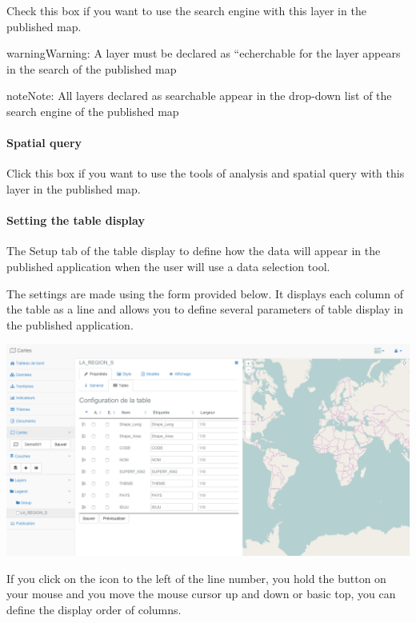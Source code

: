 \documentclass[letterpaper,10pt,english]{sphinxmanual}
\begin{document}
Check this box if you want to use the search engine with this layer in the published map.

\begin{notice}{warning}{Warning:}
A layer must be declared as ``echerchable for the layer appears in the search of the published map
\end{notice}

\begin{notice}{note}{Note:}
All layers declared as searchable appear in the drop-down list of the search engine of the published map
\end{notice}
\paragraph{Spatial query}

Click this box if you want to use the tools of analysis and spatial query with this layer in the published map.


\paragraph{Setting the table display}
\label{maps/layerstree:parametrage-de-l-affichage-de-la-table}
The Setup tab of the table display to define how the data will appear in the published application when the user will use a data selection tool.

The settings are made using the form provided below. It displays each column of the table as a line and allows you to define several parameters of table display in the published application.

\includegraphics[width=1.000\linewidth]{set-layer-table.png}

If you click on the icon to the left of the line number, you hold the button on your mouse and you move the mouse cursor up and down or basic top, you can define the display order of columns.
\end{document}
